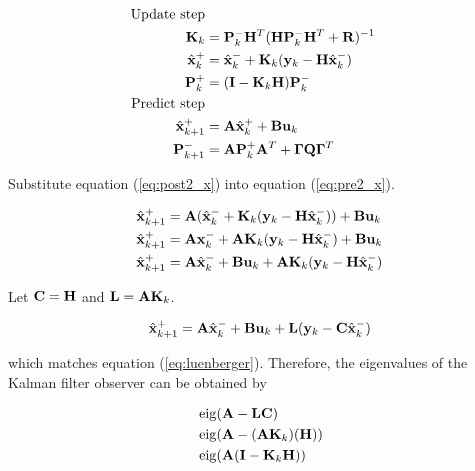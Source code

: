 \begin{align}
  \text{Update step} \nonumber \\
  \mathbf{K}_k &= \mathbf{P}_k^- \mathbf{H}^T (\mathbf{H}\mathbf{P}_k^- \mathbf{H}^T +
    \mathbf{R})^{-1} \\
  \hat{\mathbf{x}}_k^+ &= \hat{\mathbf{x}}_k^- + \mathbf{K}_k(\mathbf{y}_k -
    \mathbf{H}\hat{\mathbf{x}}_k^-) \label{eq:post2_x} \\
  \mathbf{P}_k^+ &= (\mathbf{I} - \mathbf{K}_k\mathbf{H})\mathbf{P}_k^- \\
  \text{Predict step} \nonumber \\
  \hat{\mathbf{x}}_{k+1}^+ &= \mathbf{A}\hat{\mathbf{x}}_k^+ + \mathbf{B}\mathbf{u}_k
    \label{eq:pre2_x} \\
  \mathbf{P}_{k+1}^- &= \mathbf{A} \mathbf{P}_k^+ \mathbf{A}^T +
    \mathbf{\Gamma}\mathbf{Q}\mathbf{\Gamma}^T
\end{align}

Substitute equation (\ref{eq:post2_x}) into equation (\ref{eq:pre2_x}).

\begin{align*}
  \hat{\mathbf{x}}_{k+1}^+ &= \mathbf{A}(\hat{\mathbf{x}}_k^- + \mathbf{K}_k(\mathbf{y}_k -
    \mathbf{H}\hat{\mathbf{x}}_k^-)) + \mathbf{B}\mathbf{u}_k \\
  \hat{\mathbf{x}}_{k+1}^+ &= \mathbf{A}\mathbf{x}_k^- + \mathbf{A}\mathbf{K}_k(\mathbf{y}_k -
    \mathbf{H}\hat{\mathbf{x}}_k^-) + \mathbf{B}\mathbf{u}_k \\
  \hat{\mathbf{x}}_{k+1}^+ &= \mathbf{A}\hat{\mathbf{x}}_k^- + \mathbf{B}\mathbf{u}_k +
    \mathbf{A}\mathbf{K}_k(\mathbf{y}_k - \mathbf{H}\hat{\mathbf{x}}_k^-)
\end{align*}

Let $\mathbf{C} = \mathbf{H}$ and $\mathbf{L} = \mathbf{A} \mathbf{K}_k$.

\begin{equation} \label{eq:app_kalman_leunberger}
  \hat{\mathbf{x}}_{k+1}^+ = \mathbf{A}\hat{\mathbf{x}}_k^- + \mathbf{B}\mathbf{u}_k + \mathbf{L}
    (\mathbf{y}_k - \mathbf{C}\hat{\mathbf{x}}_k^-)
\end{equation}

which matches equation (\ref{eq:luenberger}). Therefore, the eigenvalues of the
Kalman filter \gls{observer} can be obtained by

\begin{align}
  &\operatorname{eig}(\mathbf{A} - \mathbf{L}\mathbf{C}) \nonumber \\
  &\operatorname{eig}(\mathbf{A} - (\mathbf{A}\mathbf{K}_k)(\mathbf{H})) \nonumber \\
  &\operatorname{eig}(\mathbf{A}(\mathbf{I} - \mathbf{K}_k\mathbf{H}))
\end{align}

